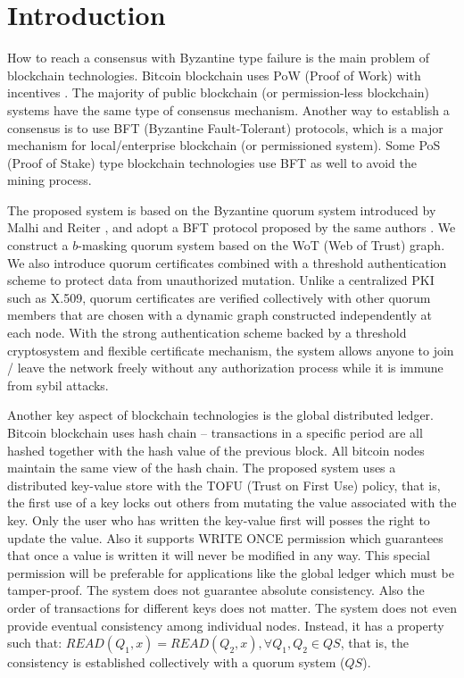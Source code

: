 \section{Introduction}
How to reach a consensus with Byzantine type failure is the main
problem of blockchain technologies. Bitcoin blockchain uses PoW (Proof
of Work) with incentives \cite{bitcoin}. The majority of public
blockchain (or permission-less blockchain) systems have the same type
of consensus mechanism. Another way to establish a consensus is to use
BFT (Byzantine Fault-Tolerant) protocols, which is a major mechanism
for local/enterprise blockchain (or permissioned system). Some PoS
(Proof of Stake) type blockchain technologies use BFT as well to avoid
the mining process.

The proposed system is based on the Byzantine quorum system introduced
by Malhi and Reiter \cite{Delhi:1}, and adopt a BFT protocol proposed by the
same authors \cite{Delhi:2}. We construct a $b$-masking quorum system
based on the WoT (Web of Trust) graph. We also introduce quorum
certificates combined with a threshold authentication scheme to
protect data from unauthorized mutation. Unlike a centralized PKI such
as X.509, quorum certificates are verified collectively with other
quorum members that are chosen with a dynamic graph constructed
independently at each node. With the strong authentication scheme
backed by a threshold cryptosystem and flexible certificate mechanism,
the system allows anyone to join / leave the network freely without
any authorization process while it is immune from sybil attacks.

Another key aspect of blockchain technologies is the global
distributed ledger. Bitcoin blockchain uses hash chain -- transactions
in a specific period are all hashed together with the hash value of
the previous block. All bitcoin nodes maintain the same view of the
hash chain.
The proposed system uses a distributed key-value store with the TOFU
(Trust on First Use) policy, that is, the first use of a key locks out
others from mutating the value associated with the key. Only the
user who has written the key-value first will posses the right to
update the value. Also it supports WRITE ONCE permission which
guarantees that once a value is written it will never be modified in
any way. This special permission will be preferable for applications
like the global ledger which must be tamper-proof.
The system does not guarantee absolute consistency. Also the order of
transactions for different keys does not matter. The system does not
even provide eventual consistency among individual nodes. Instead, it
has a property such that: $READ(Q_1, x) = READ(Q_2, x), \forall Q_1,
Q_2 \in QS$, that is, the consistency is established collectively with
a quorum system ($QS$).

